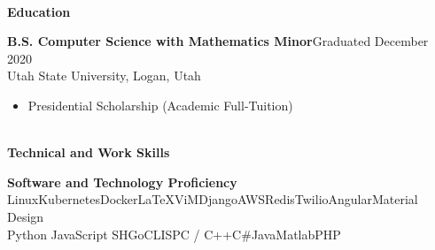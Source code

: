 \documentclass[letterpaper,11pt]{article}
\begin{document}

\begin{Large}\textbf{\\Education}\end{Large}


\textbf{B.S. Computer Science with Mathematics Minor}\hfill Graduated December 2020\\
Utah State University, Logan, Utah%
\begin{itemize}[noitemsep,topsep=0pt]
	\item Presidential Scholarship (Academic Full-Tuition)
\end{itemize}




\begin{Large}\textbf{\\Technical and Work Skills}\end{Large}

\textbf{Software and Technology Proficiency}\\
Linux\hfill Kubernetes\hfill Docker\hfill \LaTeX\hfill ViM\hfill Django\hfill AWS\hfill Redis\hfill Twilio\hfill Angular\hfill Material Design\\
Python \hfill JavaScript \hfill SH\hfill Go\hfill CLISP\hfill C / C++\hfill C\#\hfill Java\hfill Matlab\hfill PHP
\end{document}
